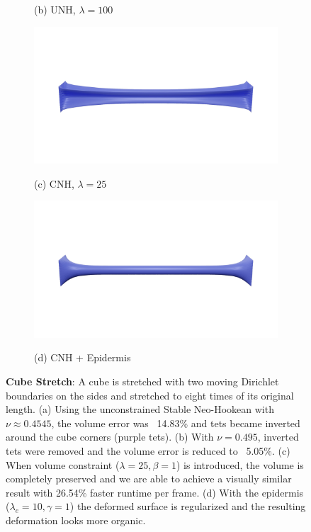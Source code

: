 \begin{figure}
\begin{subfigure}{1.0\linewidth}
		\caption*{(b) UNH, $\lambda = 100$}
		\label{sfig:stretch-snh100}
	\end{subfigure}\par\medskip
	\begin{subfigure}{1.0\linewidth}
		\centering
		{\includegraphics[width=1.0\textwidth]{images/cube_stretch/vc25-1.jpg}}
		\caption*{(c) CNH, $\lambda = 25$}
		\label{sfig:stretch-vc}
	\end{subfigure}\par\medskip
	\begin{subfigure}{1.0\linewidth}
		\centering
		{\includegraphics[width=1.0\textwidth]{images/cube_stretch/vc25-1_epi10-1.jpg}}
		\caption*{(d) CNH + Epidermis}
		\label{sfig:stretch-vcepi}
	\end{subfigure}%
	\caption{\textbf{Cube Stretch}: A cube is stretched with two moving Dirichlet boundaries on the sides and stretched to eight times of its original length. (a) Using the unconstrained Stable Neo-Hookean with $\nu \approx 0.4545$, the volume error was ~14.83\% and tets became inverted around the cube corners (purple tets). (b) With $\nu = 0.495$, inverted tets were removed and the volume error is reduced to ~5.05\%. (c) When volume constraint ($\lambda = 25, \beta = 1$) is introduced, the volume is completely preserved and we are able to achieve a visually similar result with 26.54\% faster runtime per frame. (d) With the epidermis ($\lambda_e = 10, \gamma = 1$) the deformed surface is regularized and the resulting deformation looks more organic. }
	\label{fig:cube-stretch}
\end{figure}

